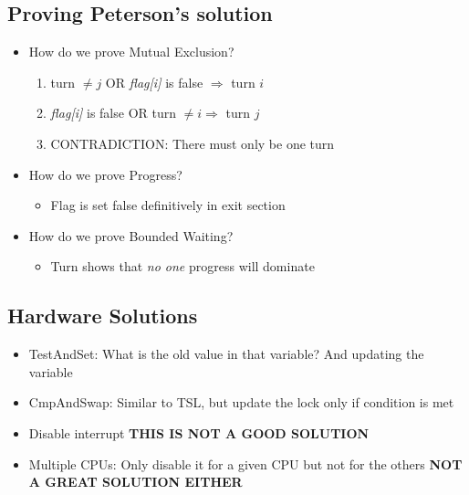 \documentclass[11pt]{article}
\begin{document}
\subsection*{Proving Peterson's solution}
\begin{itemize}
  \item How do we prove Mutual Exclusion?
  \begin{enumerate}
    \item turn $\neq j$ OR \textit{flag[i]} is false $\Rightarrow$ turn $i$
    \item \textit{flag[i]} is false OR turn $\neq i \Rightarrow$ turn $j$
    \item CONTRADICTION: There must only be one turn
  \end{enumerate}
  \item How do we prove Progress?
  \begin{itemize}
    \item Flag is set false definitively in exit section
  \end{itemize}
  \item How do we prove Bounded Waiting?
  \begin{itemize}
    \item Turn shows that \textit{no one} progress will dominate
  \end{itemize}
\end{itemize}
\subsection*{Hardware Solutions}
\begin{itemize}
  \item TestAndSet: What is the old value in that variable? And updating the
  variable
  \item CmpAndSwap: Similar to TSL, but update the lock only if condition is
  met
  \item Disable interrupt \textbf{THIS IS NOT A GOOD SOLUTION}
  \item Multiple CPUs: Only disable it for a given CPU but not for the others
  \textbf{NOT A GREAT SOLUTION EITHER}
\end{itemize}
\end{document}
